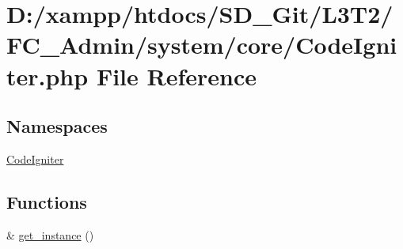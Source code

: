 \hypertarget{_admin_2system_2core_2_code_igniter_8php}{}\section{D\+:/xampp/htdocs/\+S\+D\+\_\+\+Git/\+L3\+T2/\+F\+C\+\_\+\+Admin/system/core/\+Code\+Igniter.php File Reference}
\label{_admin_2system_2core_2_code_igniter_8php}
\subsection*{Namespaces}
\begin{DoxyCompactItemize}
\item 
 \hyperlink{namespace_code_igniter}{Code\+Igniter}
\end{DoxyCompactItemize}
\subsection*{Functions}
\begin{DoxyCompactItemize}
\item 
\& \hyperlink{_admin_2system_2core_2_code_igniter_8php_a185483844bd20a0e80955460d66d2199}{get\+\_\+instance} ()
\end{DoxyCompactItemize}
